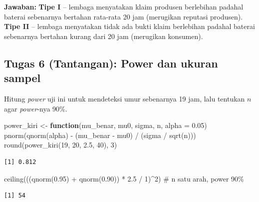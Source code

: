 \documentclass[
  indonesian,
  letterpaper,
]{book}
\newenvironment{Shaded}{\begin{snugshade}}{\end{snugshade}}
\newcommand{\AttributeTok}[1]{\textcolor[rgb]{0.40,0.45,0.13}{#1}}
\newcommand{\CommentTok}[1]{\textcolor[rgb]{0.37,0.37,0.37}{#1}}
\newcommand{\ControlFlowTok}[1]{\textcolor[rgb]{0.00,0.23,0.31}{\textbf{#1}}}
\newcommand{\DecValTok}[1]{\textcolor[rgb]{0.68,0.00,0.00}{#1}}
\newcommand{\FloatTok}[1]{\textcolor[rgb]{0.68,0.00,0.00}{#1}}
\newcommand{\FunctionTok}[1]{\textcolor[rgb]{0.28,0.35,0.67}{#1}}
\newcommand{\NormalTok}[1]{\textcolor[rgb]{0.00,0.23,0.31}{#1}}
\newcommand{\OtherTok}[1]{\textcolor[rgb]{0.00,0.23,0.31}{#1}}
\newcommand{\SpecialCharTok}[1]{\textcolor[rgb]{0.37,0.37,0.37}{#1}}
\begin{document}
\textbf{Jawaban:} \textbf{Tipe I} -- lembaga menyatakan klaim produsen
berlebihan padahal baterai sebenarnya bertahan rata-rata 20 jam
(merugikan reputasi produsen). \textbf{Tipe II} -- lembaga menyatakan
tidak ada bukti klaim berlebihan padahal baterai sebenarnya bertahan
kurang dari 20 jam (merugikan konsumen).

\subsection{Tugas 6 (Tantangan): Power dan ukuran
sampel}\label{tugas-6-tantangan-power-dan-ukuran-sampel}

Hitung \emph{power} uji ini untuk mendeteksi umur sebenarnya 19 jam,
lalu tentukan \(n\) agar \emph{power}-nya 90\%.

\begin{Shaded}
\begin{Highlighting}[]
\NormalTok{power\_kiri }\OtherTok{\textless{}{-}} \ControlFlowTok{function}\NormalTok{(mu\_benar, mu0, sigma, n, }\AttributeTok{alpha =} \FloatTok{0.05}\NormalTok{)}
  \FunctionTok{pnorm}\NormalTok{(}\FunctionTok{qnorm}\NormalTok{(alpha) }\SpecialCharTok{{-}}\NormalTok{ (mu\_benar }\SpecialCharTok{{-}}\NormalTok{ mu0) }\SpecialCharTok{/}\NormalTok{ (sigma }\SpecialCharTok{/} \FunctionTok{sqrt}\NormalTok{(n)))}
\FunctionTok{round}\NormalTok{(}\FunctionTok{power\_kiri}\NormalTok{(}\DecValTok{19}\NormalTok{, }\DecValTok{20}\NormalTok{, }\FloatTok{2.5}\NormalTok{, }\DecValTok{40}\NormalTok{), }\DecValTok{3}\NormalTok{)}
\end{Highlighting}
\end{Shaded}

\begin{verbatim}
[1] 0.812
\end{verbatim}

\begin{Shaded}
\begin{Highlighting}[]
\FunctionTok{ceiling}\NormalTok{(((}\FunctionTok{qnorm}\NormalTok{(}\FloatTok{0.95}\NormalTok{) }\SpecialCharTok{+} \FunctionTok{qnorm}\NormalTok{(}\FloatTok{0.90}\NormalTok{)) }\SpecialCharTok{*} \FloatTok{2.5} \SpecialCharTok{/} \DecValTok{1}\NormalTok{)}\SpecialCharTok{\^{}}\DecValTok{2}\NormalTok{)   }\CommentTok{\# n satu arah, power 90\%}
\end{Highlighting}
\end{Shaded}

\begin{verbatim}
[1] 54
\end{verbatim}
\end{document}
